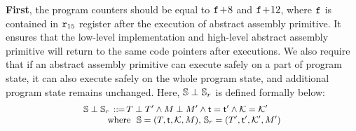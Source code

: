 \textbf{First},
the program counters should be equal to
$\texttt{f}_{}\!+\!8$ and $\texttt{f}_{}\!+\!12$, where $\texttt{f}_{}$
is contained in $\texttt{r}_{15}$ register after the execution
of abstract assembly primitive.
It ensures that the low-level implementation
and high-level abstract assembly primitive will return to
the same code pointers after executions.
We also require that
if an abstract assembly primitive
can execute safely on a part of program state,
it can also execute safely on the whole program state,
and additional program state remains unchanged.
Here, $\mathbb{S}\perp\mathbb{S}_r$ is defined formally
below:
\[
    \small
    \begin{array}{l}
        \mathbb{S}\perp\mathbb{S}_r \, ::\!\!{=} \,
        T\perp T' \land
        M\perp M' \land \textsf{t} = \textsf{t}'
        \land \mathcal{K} = \mathcal{K}' \\
        \qquad \ \
        \text{where} \ \
        \mathbb{S} = (T, \textsf{t}, \mathcal{K}, M), \,
        \mathbb{S}_r = (T', \textsf{t}', \mathcal{K}', M')
    \end{array}
\]

